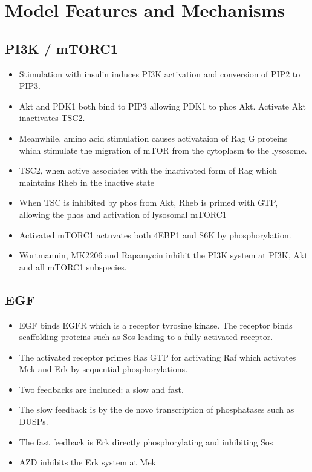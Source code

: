 \documentclass{article}
\begin{document}
    \section{Model Features and Mechanisms}
    \subsection{PI3K / mTORC1}
    \begin{itemize}
        \item Stimulation with insulin induces PI3K activation and conversion of PIP2 to PIP3.
        \item Akt and PDK1 both bind to PIP3 allowing PDK1 to phos Akt. Activate Akt inactivates TSC2.
        \item Meanwhile, amino acid stimulation causes activataion of Rag G proteins which stimulate the migration of mTOR from the cytoplasm to the lysosome.
        \item TSC2, when active associates with the inactivated form of Rag which maintains Rheb in the inactive state
        \item When TSC is inhibited by phos from Akt, Rheb is primed with GTP, allowing the phos and activation of lysosomal mTORC1
        \item Activated mTORC1 actuvates both 4EBP1 and S6K by phosphorylation.
        \item Wortmannin, MK2206 and Rapamycin inhibit the PI3K system at PI3K, Akt and all mTORC1 subspecies.
    \end{itemize}

    \subsection{EGF}
    \begin{itemize}
        \item EGF binds EGFR which is a receptor tyrosine kinase. The receptor binds scaffolding proteins such as Sos leading to a fully activated receptor.
        \item The activated receptor primes Ras GTP for activating Raf which activates Mek and Erk by sequential phosphorylations.
        \item Two feedbacks are included: a slow and fast.
        \item The slow feedback is by the de novo transcription of phosphatases such as DUSPs.
        \item The fast feedback is Erk directly phosphorylating and inhibiting Sos
        \item AZD inhibits the Erk system at Mek
    \end{itemize}
\end{document}
